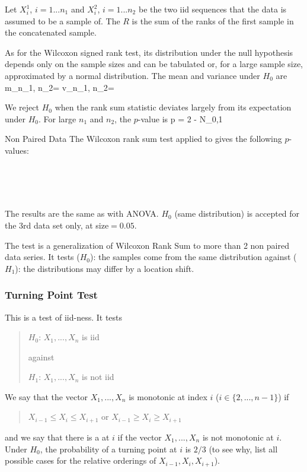Let $X^1_i$, $i=1...n_1$ and $X^2_i$, $i=1...n_2$ be the two iid
sequences that the data is assumed to be a sample of. The
 $R$ is the sum of the ranks of
the first sample in the concatenated sample.

As for the Wilcoxon signed rank test, its distribution under
the null hypothesis depends only on the sample sizes and can be
tabulated or, for a large sample size, approximated by a normal
distribution. The mean and variance under $H_0$ are
 \be
m_{n_1, n_2}= \ee
 \be
v_{n_1, n_2}= \ee

We reject $H_0$ when the rank sum statistic deviates largely
from its expectation under $H_0$. For large $n_1$ and $n_2$,
the $p$-value is
 \be
 p = 2  - N_{0,1}\lp
  \rp \rp
 \ee

\begin{ex}{Non Paired Data}
The Wilcoxon rank sum test applied to
 gives the following $p$-values:

{\footnotesize
 \\
 \\
 \\
}

The results are the same as with ANOVA. $H_0$ (same distribution)
is accepted for the 3rd data set only, at size$=0.05$.
\end{ex}

The  test is a generalization of Wilcoxon Rank
Sum to more than 2 non paired data series. It tests ($H_0$): the
samples come from the same distribution against ($H_1$): the
distributions may differ by a location shift.

\subsubsection{Turning Point Test}\label{sec-turning-point}
This is a test of iid-ness. It tests
 \begin{quote}
 $H_0$: $X_1, ..., X_n$ is iid

 against

 $H_1$: $X_1, ..., X_n$ is not iid
 \end{quote}

We say that the vector $X_1, ...,X_n$ is monotonic at index $i$
($i \in \{2,...,n-1\}$) if
 \begin{quote}$X_{i-1} \leq X_i \leq
X_{i+ 1}$ or $X_{i-1} \geq X_i \geq X_{i+ 1}$ \end{quote} and
we say that there is a  at $i$ if the vector
$X_1, ...,X_n$ is not monotonic at $i$. Under $H_0$, the
probability of a turning point at $i$ is $2/3$ (to see why,
list all possible cases for the relative orderings of $X_{i-1},
X_i, X_{i+ 1}$).

